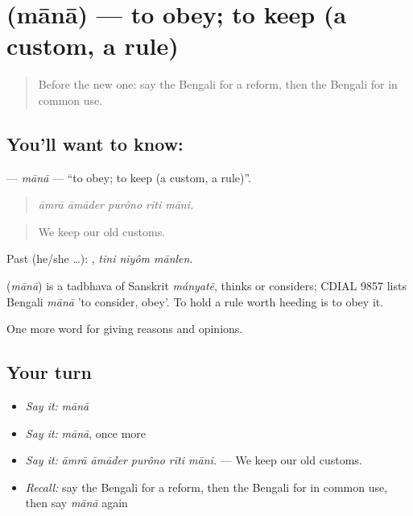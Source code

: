 \section[\texorpdfstring{\bn{মানা} (mānā)}{মানা (mānā)}]{ (mānā) — to obey; to keep (a custom, a rule)}

\label{lesson:BN-C353-mana}



\begin{quote}
Before the new one: say the Bengali for a reform, then the Bengali for in common use.
\end{quote}

\subsection*{You'll want to know: }
\textbf{} — \emph{mānā} — \textquotedblleft{}to obey; to keep (a custom, a rule)\textquotedblright{}.

\begin{quote}
    
\end{quote}

\begin{quote}
\emph{āmrā āmāder purôno rīti māni.}
\end{quote}

\begin{quote}
We keep our old customs.
\end{quote}

Past (he/she …):   , \emph{tini niyôm mānlen}.

\begin{cousinweb}
\textbf{} (\emph{mānā}) is a tadbhava of Sanskrit \emph{mányatē}, thinks or considers; CDIAL 9857 lists Bengali \emph{mānā} 'to consider, obey'. To hold a rule worth heeding is to obey it.
\end{cousinweb}

\begin{grammarlens}[title={What you've built}]
One more word for giving reasons and opinions.
\end{grammarlens}

\subsection*{Your turn}
\begin{itemize}
\raggedright
  \item \emph{Say it:} \emph{mānā}
  \item \emph{Say it:} \emph{mānā}, once more
  \item \emph{Say it:} \emph{āmrā āmāder purôno rīti māni.} — We keep our old customs.
  \item \emph{Recall:} say the Bengali for a reform, then the Bengali for in common use, then say \emph{mānā} again
\end{itemize}

